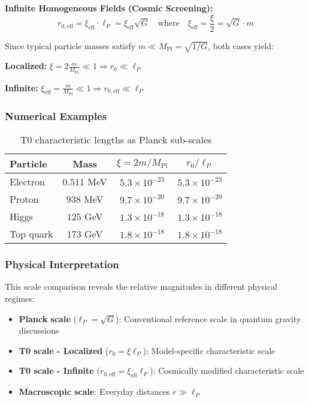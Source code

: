 \documentclass[12pt,a4paper]{article}
\begin{document}
\textbf{Infinite Homogeneous Fields (Cosmic Screening):}
\begin{equation}
	r_{0,\text{eff}} = \xi_{\text{eff}} \cdot \ell_P = \xi_{\text{eff}} \sqrt{G} \quad \text{where} \quad \xi_{\text{eff}} = \frac{\xi}{2} = \sqrt{G} \cdot m
\end{equation}

Since typical particle masses satisfy $m \ll M_{\text{Pl}} = \sqrt{1/G}$, both cases yield:

\textbf{Localized:} $\xi = 2\frac{m}{M_{\text{Pl}}} \ll 1 \Rightarrow r_0 \ll \ell_P$

\textbf{Infinite:} $\xi_{\text{eff}} = \frac{m}{M_{\text{Pl}}} \ll 1 \Rightarrow r_{0,\text{eff}} \ll \ell_P$

\subsubsection{Numerical Examples}
\label{subsubsec:numerical_examples}

\begin{table}[htbp]
	\centering
	\begin{tabular}{|l|c|c|c|}
		\hline
		\textbf{Particle} & \textbf{Mass} & \textbf{$\xi = 2m/M_{\text{Pl}}$} & \textbf{$r_0/\ell_P$} \\
		\hline
		Electron & $0.511$ MeV & $5.3 \times 10^{-23}$ & $5.3 \times 10^{-23}$ \\
		Proton & $938$ MeV & $9.7 \times 10^{-20}$ & $9.7 \times 10^{-20}$ \\
		Higgs & $125$ GeV & $1.3 \times 10^{-18}$ & $1.3 \times 10^{-18}$ \\
		Top quark & $173$ GeV & $1.8 \times 10^{-18}$ & $1.8 \times 10^{-18}$ \\
		\hline
	\end{tabular}
	\caption{T0 characteristic lengths as Planck sub-scales}
\end{table}

\subsubsection{Physical Interpretation}
\label{subsubsec:physical_interpretation}

This scale comparison reveals the relative magnitudes in different physical regimes:

\begin{itemize}
	\item \textbf{Planck scale} ($\ell_P = \sqrt{G}$): Conventional reference scale in quantum gravity discussions
	\item \textbf{T0 scale - Localized} ($r_0 = \xi \ell_P$): Model-specific characteristic scale 
	\item \textbf{T0 scale - Infinite} ($r_{0,\text{eff}} = \xi_{\text{eff}} \ell_P$): Cosmically modified characteristic scale
	\item \textbf{Macroscopic scale}: Everyday distances $r \gg \ell_P$
\end{itemize}
\end{document}
